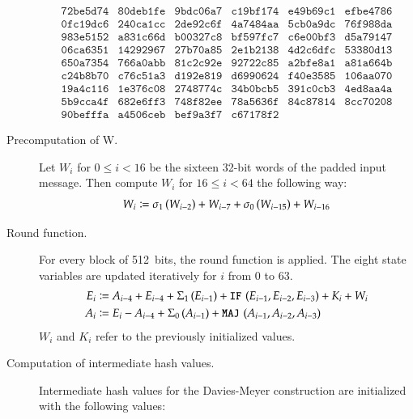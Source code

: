 \begin{description}
\[\begin{array}{cccccc}
        \texttt{72be5d74} & \texttt{80deb1fe} & \texttt{9bdc06a7} & \texttt{c19bf174} & \texttt{e49b69c1} & \texttt{efbe4786} \\
        \texttt{0fc19dc6} & \texttt{240ca1cc} & \texttt{2de92c6f} & \texttt{4a7484aa} & \texttt{5cb0a9dc} & \texttt{76f988da} \\
        \texttt{983e5152} & \texttt{a831c66d} & \texttt{b00327c8} & \texttt{bf597fc7} & \texttt{c6e00bf3} & \texttt{d5a79147} \\
        \texttt{06ca6351} & \texttt{14292967} & \texttt{27b70a85} & \texttt{2e1b2138} & \texttt{4d2c6dfc} & \texttt{53380d13} \\
        \texttt{650a7354} & \texttt{766a0abb} & \texttt{81c2c92e} & \texttt{92722c85} & \texttt{a2bfe8a1} & \texttt{a81a664b} \\
        \texttt{c24b8b70} & \texttt{c76c51a3} & \texttt{d192e819} & \texttt{d6990624} & \texttt{f40e3585} & \texttt{106aa070} \\
        \texttt{19a4c116} & \texttt{1e376c08} & \texttt{2748774c} & \texttt{34b0bcb5} & \texttt{391c0cb3} & \texttt{4ed8aa4a} \\
        \texttt{5b9cca4f} & \texttt{682e6ff3} & \texttt{748f82ee} & \texttt{78a5636f} & \texttt{84c87814} & \texttt{8cc70208} \\
        \texttt{90befffa} & \texttt{a4506ceb} & \texttt{bef9a3f7} & \texttt{c67178f2}
      \end{array}
    \]
  \item[Precomputation of W.]
    Let $W_i$ for $0 \leq i < 16$ be the sixteen 32-bit words of the padded input message.
    Then compute $W_i$ for $16 \leq i < 64$ the following way:
    \[ W_i \coloneqq \operatorname{\sigma_1\,}(W_{i-2}) + W_{i-7} + \operatorname{\sigma_0\,}(W_{i-15}) + W_{i-16} \]
  \item[Round function.]
    For every block of 512~bits, the round function is applied.
    The eight state variables are updated iteratively for $i$ from 0 to 63.
    \begin{align*}
      E_i     &\coloneqq A_{i-4} + E_{i-4} + \operatorname{\Sigma_1\,}(E_{i-1}) + \operatorname{\texttt{IF\,}}{(E_{i-1}, E_{i-2}, E_{i-3})} + K_i + W_i \\
      A_i     &\coloneqq E_i - A_{i-4} + \operatorname{\Sigma_0\,}(A_{i-1}) + \operatorname{\texttt{MAJ\,}}{(A_{i-1}, A_{i-2}, A_{i-3})}
    \end{align*}
    $W_i$ and $K_i$ refer to the previously initialized values.
  \item[Computation of intermediate hash values.]
    Intermediate hash values for the Davies-Meyer construction are
    initialized with the following values:

\end{description}
